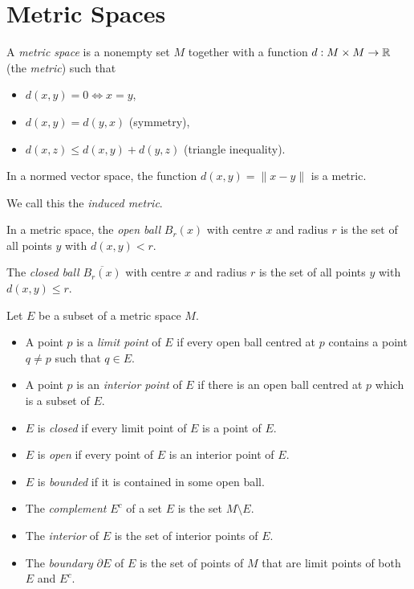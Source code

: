 \chapter{Metric Spaces}
\begin{defn}
  A \emph{metric space} is a nonempty set $M$ together with a function
  $d:M\times M\to\mathbb{R}$ (the \emph{metric}) such that
  \begin{itemize}
    \item $d(x,y)=0\iff x=y$,
    \item $d(x,y)=d(y,x)$ (symmetry), 
    \item $d(x,z)\le d(x,y)+d(y,z)$ (triangle inequality).
  \end{itemize}
\end{defn}
\begin{prop}
  In a normed vector space, the function $d(x,y)=\|x-y\|$ is a metric.
\end{prop}
\begin{defn}
  We call this the \emph{induced metric}.
\end{defn}
\begin{defn}
  In a metric space, the \emph{open ball} $B_r(x)$ with centre $x$ and radius $r$ is the
  set of all points $y$ with $d(x,y)<r$.

  The \emph{closed ball} $\overline{B_r(x)}$ with centre $x$ and radius $r$ is
  the set of all points $y$ with $d(x,y)\le r$.
\end{defn}
\begin{defn}
  Let $E$ be a subset of a metric space $M$.
  \begin{itemize}
    \item A point $p$ is a \emph{limit point} of $E$ if every open ball centred
      at $p$ contains a point $q\ne p$ such that $q\in E$.
    \item A point $p$ is an \emph{interior point} of $E$ if there is an open
      ball centred at $p$ which is a subset of $E$.
    \item $E$ is \emph{closed} if every limit point of $E$ is a point of $E$.
    \item $E$ is \emph{open} if every point of $E$ is an interior point of $E$.
    \item $E$ is \emph{bounded} if it is contained in some open ball.
    \item The \emph{complement} $E^c$ of a set $E$ is the set $M\setminus E$.
    \item The \emph{interior} of $E$ is the set of interior points of $E$.
    \item The \emph{boundary} $\partial E$ of $E$ is the set of points of $M$
      that are limit points of both $E$ and $E^c$.
  \end{itemize}
\end{defn}
